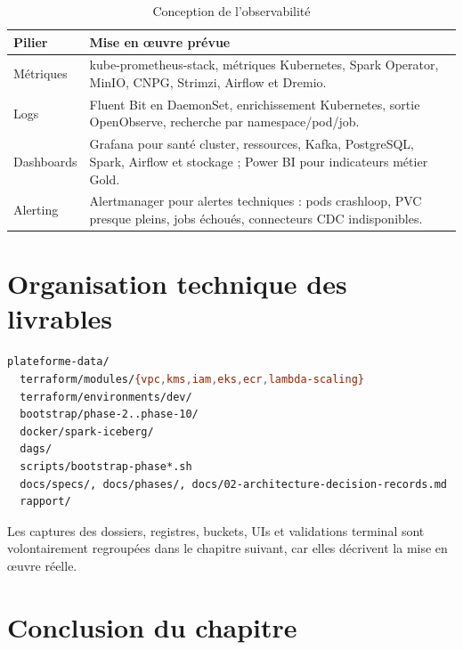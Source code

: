 \begin{table}[H]
\centering
\caption{Conception de l'observabilité}
\label{tab:observabilite-conception}
\small
\begin{tabular}{@{}p{}p{}@{}}
\toprule
\textbf{Pilier} & \textbf{Mise en œuvre prévue} \\
\midrule
Métriques & kube-prometheus-stack, métriques Kubernetes, Spark Operator, MinIO, CNPG, Strimzi, Airflow et Dremio. \\
Logs & Fluent Bit en DaemonSet, enrichissement Kubernetes, sortie OpenObserve, recherche par namespace/pod/job. \\
Dashboards & Grafana pour santé cluster, ressources, Kafka, PostgreSQL, Spark, Airflow et stockage ; Power BI pour indicateurs métier Gold. \\
Alerting & Alertmanager pour alertes techniques : pods crashloop, PVC presque pleins, jobs échoués, connecteurs CDC indisponibles. \\
\bottomrule
\end{tabular}
\end{table}

\section{Organisation technique des livrables}

\begin{lstlisting}[language=bash,caption={Organisation technique des livrables}]
plateforme-data/
  terraform/modules/{vpc,kms,iam,eks,ecr,lambda-scaling}
  terraform/environments/dev/
  bootstrap/phase-2..phase-10/
  docker/spark-iceberg/
  dags/
  scripts/bootstrap-phase*.sh
  docs/specs/, docs/phases/, docs/02-architecture-decision-records.md
  rapport/
\end{lstlisting}

Les captures des dossiers, registres, buckets, UIs et validations terminal sont volontairement regroupées dans le chapitre suivant, car elles décrivent la mise en œuvre réelle.

\section*{Conclusion du chapitre}

